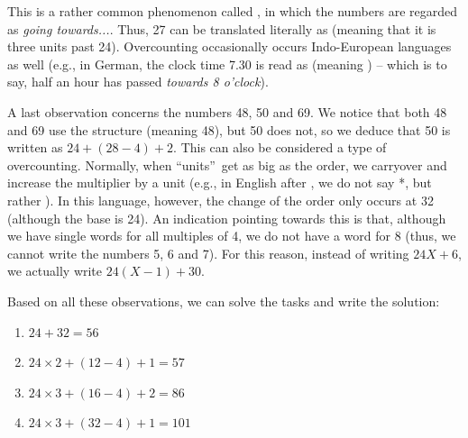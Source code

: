 \begin{refsection}
\begin{mysolution}
This is a rather common phenomenon called , in which the numbers are regarded as \textit{going towards...}. Thus, 27 can be translated literally as  (meaning that it is three units past 24). Overcounting occasionally occurs Indo-European languages as well (e.g., in German, the clock time 7.30 is read as  (meaning ) – which is to say, half an hour has passed \textit{towards 8 o'clock}).

A last observation concerns the numbers 48, 50 and 69. We notice that both 48 and 69 use the structure  (meaning 48), but 50 does not, so we deduce that 50 is written as $24 + (28-4) + 2$. This can also be considered a type of overcounting. Normally, when “units”\ get as big as the order, we carryover and increase the multiplier by a unit (e.g., in English after , we do not say *, but rather ). In this language, however, the change of the order only occurs at 32 (although the base is 24). An indication pointing towards this is that, although we have single words for all multiples of 4, we do not have a word for 8 (thus, we cannot write the numbers 5, 6 and 7). For this reason, instead of writing $24X + 6$, we actually write $24(X-1) + 30$.

Based on all these observations, we can solve the tasks and write the solution:

\begin{solutions}
    \item
    \begin{enumerate}[label = \alph*., noitemsep]
        \item $24 + 32 = 56$
        \item $24\times2 + (12-4) + 1 = 57$
        \item $24\times3 + (16-4) + 2 = 86$
        \item $24\times3 + (32-4) + 1 = 101$
    \end{enumerate}
\end{solutions}



\end{mysolution}
\end{refsection}
